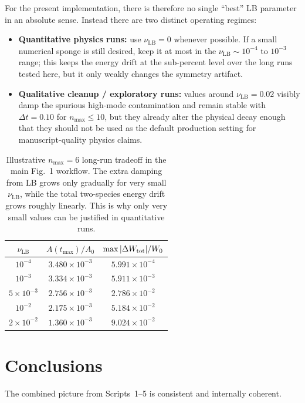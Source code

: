 \documentclass[11pt]{article}
\begin{document}
For the present implementation, there is therefore no single ``best'' LB parameter in an absolute sense.
Instead there are two distinct operating regimes:
\begin{itemize}[leftmargin=1.5em]
    \item \textbf{Quantitative physics runs:} use $\nu_{\mathrm{LB}}=0$ whenever possible.
    If a small numerical sponge is still desired, keep it at most in the \(\nu_{\mathrm{LB}}\sim 10^{-4}\) to \(10^{-3}\) range; this keeps the energy drift at the sub-percent level over the long runs tested here, but it only weakly changes the symmetry artifact.
    \item \textbf{Qualitative cleanup / exploratory runs:} values around \(\nu_{\mathrm{LB}}=0.02\) visibly damp the spurious high-mode contamination and remain stable with \(\Delta t=0.10\) for \(n_{\max}\le 10\), but they already alter the physical decay enough that they should not be used as the default production setting for manuscript-quality physics claims.
\end{itemize}

\begin{table}[H]
    \centering
    \caption{Illustrative $n_{\max}=6$ long-run tradeoff in the main Fig.~1 workflow.
    The extra damping from LB grows only gradually for very small \(\nu_{\mathrm{LB}}\), while the total two-species energy drift grows roughly linearly.
    This is why only very small values can be justified in quantitative runs.}
    \label{tab:smallnu}
    \begin{tabular}{@{}ccc@{}}
    \toprule
    $\nu_{\mathrm{LB}}$ & $A(t_{\max})/A_0$ & $\max|\Delta W_{\rm tot}|/W_0$ \\
    \midrule
    $10^{-4}$ & $3.480\times 10^{-3}$ & $5.991\times 10^{-4}$ \\
    $10^{-3}$ & $3.334\times 10^{-3}$ & $5.911\times 10^{-3}$ \\
    $5\times 10^{-3}$ & $2.756\times 10^{-3}$ & $2.786\times 10^{-2}$ \\
    $10^{-2}$ & $2.175\times 10^{-3}$ & $5.184\times 10^{-2}$ \\
    $2\times 10^{-2}$ & $1.360\times 10^{-3}$ & $9.024\times 10^{-2}$ \\
    \bottomrule
    \end{tabular}
\end{table}

\section{Conclusions}
The combined picture from Scripts~1--5 is consistent and internally coherent.
\end{document}
